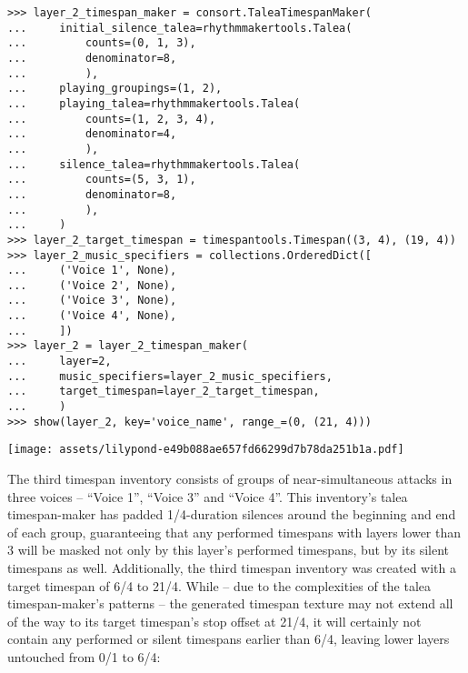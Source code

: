 \begin{abjadbookoutput}
\begin{singlespacing}
\vspace{-0.5\baselineskip}
\begin{lstlisting}
>>> layer_2_timespan_maker = consort.TaleaTimespanMaker(
...     initial_silence_talea=rhythmmakertools.Talea(
...         counts=(0, 1, 3),
...         denominator=8,
...         ),
...     playing_groupings=(1, 2),
...     playing_talea=rhythmmakertools.Talea(
...         counts=(1, 2, 3, 4),
...         denominator=4,
...         ),
...     silence_talea=rhythmmakertools.Talea(
...         counts=(5, 3, 1),
...         denominator=8,
...         ),
...     )
>>> layer_2_target_timespan = timespantools.Timespan((3, 4), (19, 4))
>>> layer_2_music_specifiers = collections.OrderedDict([
...     ('Voice 1', None),
...     ('Voice 2', None),
...     ('Voice 3', None),
...     ('Voice 4', None),
...     ])
>>> layer_2 = layer_2_timespan_maker(
...     layer=2,
...     music_specifiers=layer_2_music_specifiers,
...     target_timespan=layer_2_target_timespan,
...     )
>>> show(layer_2, key='voice_name', range_=(0, (21, 4)))
\end{lstlisting}
\noindent\texttt{[image: assets/lilypond-e49b088ae657fd66299d7b78da251b1a.pdf]}
\end{singlespacing}
\end{abjadbookoutput}

\noindent The third timespan inventory consists of groups of near-simultaneous
attacks in three voices -- \enquote{Voice 1}, \enquote{Voice 3} and
\enquote{Voice 4}. This inventory's talea timespan-maker has padded
1/4-duration silences around the beginning and end of each group, guaranteeing
that any performed timespans with layers lower than 3 will be masked not only
by this layer's performed timespans, but by its silent timespans as well.
Additionally, the third timespan inventory was created with a target timespan
of 6/4 to 21/4. While -- due to the complexities of the talea timespan-maker's
patterns -- the generated timespan texture may not extend all of the way to its
target timespan's stop offset at 21/4, it will certainly not contain any
performed or silent timespans earlier than 6/4, leaving lower layers untouched
from 0/1 to 6/4:

\begin{comment}
<abjad>
layer_3_timespan_maker = consort.TaleaTimespanMaker(
    initial_silence_talea=rhythmmakertools.Talea(
        counts=(0, 0, 0, 1),
        denominator=8,
        ),
    padding=Duration(1, 4),
    playing_talea=rhythmmakertools.Talea(
        counts=(2, 3, 4),
        denominator=8,
        ),
    silence_talea=rhythmmakertools.Talea(
        counts=(6,),
        denominator=4,
        ),
    synchronize_step=True,
    )
layer_3_target_timespan = timespantools.Timespan((6, 4), (21, 4))
layer_3_music_specifiers = collections.OrderedDict([
    ('Voice 1', None),
    ('Voice 3', None),
    ('Voice 4', None),
    ])
layer_3 = layer_3_timespan_maker(
    layer=3,
    music_specifiers=layer_3_music_specifiers,
    target_timespan=layer_3_target_timespan,
    )
show(layer_3, key='voice_name', range_=(0, (21, 4)))
</abjad>
\end{comment}

